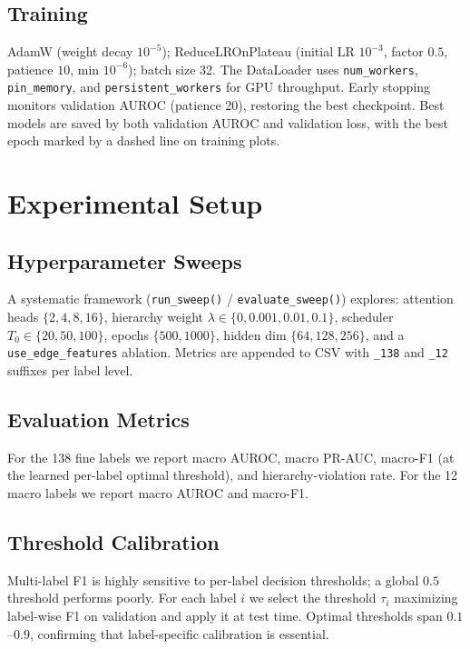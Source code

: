 \documentclass[10pt,twocolumn]{article}
\begin{document}
\subsection{Training}
AdamW (weight decay $10^{-5}$); ReduceLROnPlateau (initial LR $10^{-3}$, factor $0.5$, patience $10$, min $10^{-6}$); batch size 32. The DataLoader uses \texttt{num\_workers}, \texttt{pin\_memory}, and \texttt{persistent\_workers} for GPU throughput. Early stopping monitors validation AUROC (patience 20), restoring the best checkpoint. Best models are saved by both validation AUROC and validation loss, with the best epoch marked by a dashed line on training plots.

\section{Experimental Setup}

\subsection{Hyperparameter Sweeps}
A systematic framework (\texttt{run\_sweep()} / \texttt{evaluate\_sweep()}) explores: attention heads $\{2,4,8,16\}$, hierarchy weight $\lambda\in\{0,0.001,0.01,0.1\}$, scheduler $T_0\in\{20,50,100\}$, epochs $\{500,1000\}$, hidden dim $\{64,128,256\}$, and a \texttt{use\_edge\_features} ablation. Metrics are appended to CSV with \texttt{\_138} and \texttt{\_12} suffixes per label level.

\subsection{Evaluation Metrics}
For the 138 fine labels we report macro AUROC, macro PR-AUC, macro-F1 (at the learned per-label optimal threshold), and hierarchy-violation rate. For the 12 macro labels we report macro AUROC and macro-F1.

\subsection{Threshold Calibration}
Multi-label F1 is highly sensitive to per-label decision thresholds; a global $0.5$ threshold performs poorly. For each label $i$ we select the threshold $\tau_i$ maximizing label-wise F1 on validation and apply it at test time. Optimal thresholds span $0.1$--$0.9$, confirming that label-specific calibration is essential.
\end{document}
